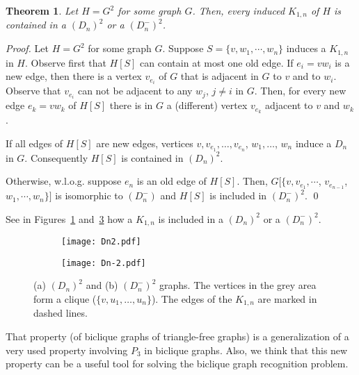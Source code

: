 \documentclass{article}
\newtheorem{theorem}{Theorem}
\begin{document}
\begin{theorem}\label{thm.Dnsquare}
  Let $H=G^2$ for some graph $G$. Then, every induced $K_{1,n}$ of $H$ is contained in a $(D_n)^2$ or a $(D^-_ n)^2$.
\end{theorem}
\begin{proof}%
  Let  $H  = G^2$ for some graph $G$.   
  Suppose $S= \{v, w_1,\cdots, w_n\}$ induces a $K_{1,n}$ in $H$. 
  Observe first that $H[S]$ can contain at most one old
  edge. %
  If $e_i=vw_i$ is a new edge, then there  is a vertex  $v_{e_i}$ of
  $G$ that  is adjacent in  $G$ to $v$ and to $w_i$. Observe that $v_{e_i}$ can not be adjacent to any $w_j$, $j \neq i$ in $G$. Then, for every new edge $e_k=vw_k$ of $H[S]$ there is in $G$ a (different) vertex $v_{e_k}$ adjacent to $v$ and $w_k$. 
  
  If all edges of $H[S]$  are new edges, vertices $v, v_{e_1}, \ldots, v_{e_n}$, $w_1, \ldots$, $w_n$ induce 
 a $D_n$ in $G$. Consequently $H[S]$ is contained in $(D_n)^2$.
 
 Otherwise, w.l.o.g. suppose $e_n$ is an old edge of $H[S]$. Then,  $G[\{v, v_{e_1}, \cdots$, $v_{e_{n-1}}$, $w_1, \cdots, w_n\}]$ is isomorphic to $(D^-_ n)$ and $H[S]$ 
 is included in $(D^-_ n)^2$.
  \qed
\end{proof}

See in Figures~\ref{fig:Dn2} and~\ref{fig:Dn-2} how a $K_{1,n}$ is included in a $(D_n)^2$ or a $(D^-_n)^2$.

\begin{figure}[htb]
\centering
\begin{subfigure}{.5\textwidth}
  \centering
  \texttt{[image: Dn2.pdf]}
  \caption{}
  \label{fig:Dn2}
\end{subfigure}%
\begin{subfigure}{.5\textwidth}
  \centering
  \texttt{[image: Dn-2.pdf]}
  \caption{}
  \label{fig:Dn-2}
\end{subfigure}%
\caption{(a) $(D_n)^2$ and (b) $(D^-_n)^2$ graphs. The vertices in the grey area form a clique ($\{v,u_1, \ldots, u_n\}$). The edges of the $K_{1,n}$ are marked in dashed lines.}
\end{figure}

That property (of biclique graphs of triangle-free graphs) is a generalization 
of a very used property involving $P_3$ in
biclique graphs. Also, we think that this new property can be a useful tool
for solving the biclique graph recognition problem.
\end{document}
